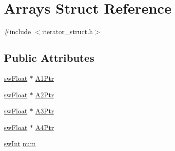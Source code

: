 \hypertarget{structArrays}{
\section{Arrays Struct Reference}
\label{structArrays}
}


{\ttfamily \#include $<$iterator\_\-struct.h$>$}\subsection*{Public Attributes}
\begin{DoxyCompactItemize}
\item 
\hyperlink{swMacro_8h_a4ce60b1aa82e56b7372553a6a5bf2c0b}{swFloat} $\ast$ \hyperlink{structArrays_a4afff80d1350b239c63ccebefb0bbcdc}{A1Ptr}
\item 
\hyperlink{swMacro_8h_a4ce60b1aa82e56b7372553a6a5bf2c0b}{swFloat} $\ast$ \hyperlink{structArrays_a20f4dd3a96e92c901b4a8e5839ce56d4}{A2Ptr}
\item 
\hyperlink{swMacro_8h_a4ce60b1aa82e56b7372553a6a5bf2c0b}{swFloat} $\ast$ \hyperlink{structArrays_a31f864fe33526915aae04225e7247dae}{A3Ptr}
\item 
\hyperlink{swMacro_8h_a4ce60b1aa82e56b7372553a6a5bf2c0b}{swFloat} $\ast$ \hyperlink{structArrays_a58dccb45a8327bcc3a5b9404545a88e4}{A4Ptr}
\item 
\hyperlink{swMacro_8h_a113cf5f6b5377cdf3fac6aa4e443e9aa}{swInt} \hyperlink{structArrays_a966d6557f9a47938f7b8928470361215}{num}
\end{DoxyCompactItemize}


